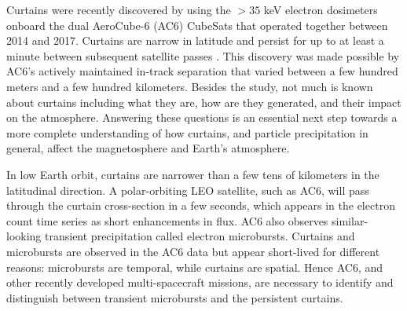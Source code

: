 \documentclass[draft]{agujournal2019}
\begin{document}
 Curtains were recently discovered by  using the $> 35$ keV electron dosimeters onboard the dual AeroCube-6 (AC6) CubeSats that operated together between  2014 and 2017. Curtains are narrow in latitude and persist for up to at least a minute between subsequent satellite passes . This discovery was made possible by AC6's actively maintained in-track separation that varied between a few hundred meters and a few hundred kilometers. Besides the  study, not much is known about curtains including what they are, how are they generated, and their impact on the atmosphere. Answering these questions is an essential next step towards a more complete understanding of how curtains, and particle precipitation in general, affect the magnetosphere and Earth's atmosphere.

In low Earth orbit, curtains are narrower than a few tens of kilometers in the latitudinal direction. A polar-orbiting LEO satellite, such as AC6, will pass through the curtain cross-section in a few seconds, which appears in the electron count time series as short enhancements in flux. AC6 also observes similar-looking transient precipitation called electron microbursts. Curtains and microbursts are observed in the AC6 data but appear short-lived for different reasons: microbursts are temporal, while curtains are spatial. Hence AC6, and other recently developed multi-spacecraft missions, are necessary to identify and distinguish between transient microbursts and the persistent curtains.
\end{document}
